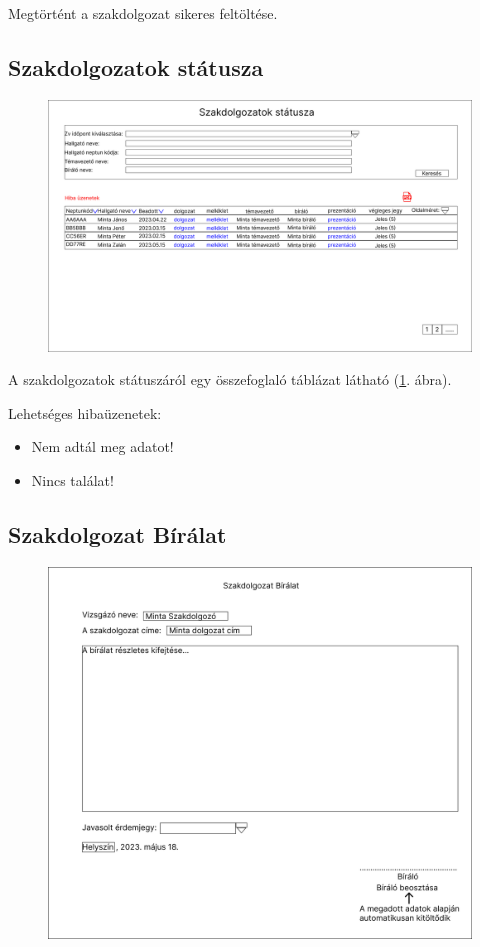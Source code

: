 \documentclass[a4paper,12pt]{article}
\begin{document}
Megtörtént a szakdolgozat sikeres feltöltése.

\subsection{Szakdolgozatok státusza}

\begin{figure}
	\centering
	\includegraphics[width=\textwidth]{images/Web_pages/Thesis_Status.jpg}
	\caption{}
	\label{fig:Thesis_Status}
\end{figure}

A szakdolgozatok státuszáról egy összefoglaló táblázat látható (\ref{fig:Thesis_Status}. ábra).

Lehetséges hibaüzenetek:
\begin{itemize}
	\item Nem adtál meg adatot!
	\item Nincs találat!
\end{itemize}

\subsection{Szakdolgozat Bírálat}

\begin{figure}
	\centering
	\includegraphics[width=\textwidth]{images/Web_pages/Thesis_Review.jpg}
	\caption{}
	\label{fig:Thesis_Review}
\end{figure}
\end{document}
